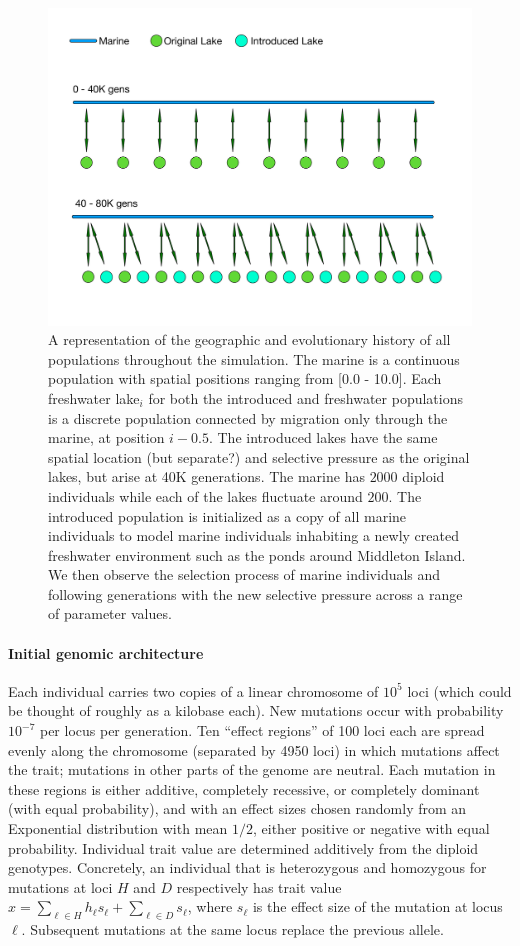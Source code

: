 \documentclass{article}
\begin{document}
\begin{figure}
	\begin{center}
  		\includegraphics[width=0.6\linewidth]{GeographyDiagram}
  		\caption{A representation of the geographic and evolutionary history of all populations throughout the simulation. The marine is a continuous population with spatial positions ranging from [0.0 - 10.0]. Each freshwater lake$_{i}$ for both the introduced and freshwater populations is a discrete population connected by migration only through the marine, at position $i - 0.5$. The introduced lakes have the same spatial location (but separate?) and selective pressure as the original lakes, but arise at 40K generations. The marine has $2000$ diploid individuals while each of the lakes fluctuate around $200$. The introduced population is initialized as a copy of all marine individuals to model marine individuals inhabiting a newly created freshwater environment such as the ponds around Middleton Island. We then observe the selection process of marine individuals and following generations with the new selective pressure across a range of parameter values. 
		}
  		\label{fig:Geo}
	\end{center}
\end{figure}


\paragraph{Initial genomic architecture} Each individual carries two copies of a linear chromosome of $10^5$ loci (which could be thought of roughly as a kilobase each). New mutations occur with probability $10^{-7}$ per locus per generation. Ten ``effect regions'' of 100 loci each are spread evenly along the chromosome (separated by 4950 loci) in which mutations affect the trait; mutations in other parts of the genome are neutral. Each mutation in these regions is either additive, completely recessive, or completely dominant (with equal probability), and with an effect sizes chosen randomly from an Exponential distribution with mean $1/2$, either positive or negative with equal probability. Individual trait value are determined additively from the diploid genotypes. Concretely, an individual that is heterozygous and homozygous for mutations at loci $H$ and $D$ respectively has trait value $x = \sum_{\ell \in H} h_\ell s_\ell + \sum_{\ell \in D} s_\ell$, where $s_\ell$ is the effect size of the mutation at locus $\ell$. Subsequent mutations at the same locus replace the previous allele.
\end{document}
